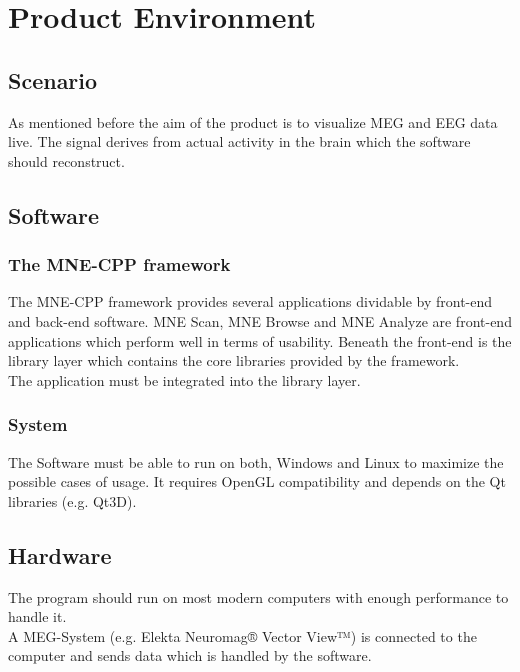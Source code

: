 \section {Product Environment}
\subsection{Scenario}
As mentioned before the aim of the product is to visualize MEG and EEG data live. The signal derives from actual activity in the brain which the software should reconstruct. 


\subsection{Software}
\subsubsection{The MNE-CPP framework}The MNE-CPP framework provides several applications dividable by front-end and back-end software. MNE Scan, MNE Browse and MNE Analyze are front-end applications which perform well in terms of usability.
Beneath the front-end is the library layer which contains the core libraries provided by the framework.\\
The application must be integrated into the library layer.
\subsubsection{System}
The Software must be able to run on both, Windows and Linux to maximize the possible cases of usage. It requires OpenGL compatibility and depends on the Qt libraries (e.g. Qt3D).
\subsection{Hardware}
The program should run on most modern computers with enough performance to handle it. \\
A MEG-System (e.g. Elekta Neuromag® Vector View™) is connected to the computer and sends data which is handled by the software.